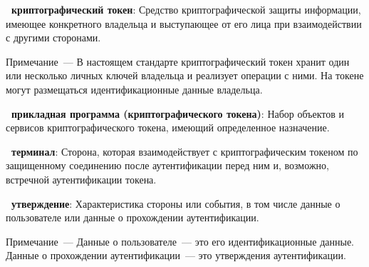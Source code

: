 {\bf\thedefctr~криптографический токен}: 
Средство криптографической защиты информации, имеющее конкретного 
владельца и выступающее от его лица при взаимодействии с другими 
сторонами. 
%
\begin{note}
Примечание~--- В настоящем стандарте криптографический токен хранит один 
или несколько личных ключей владельца и реализует операции с ними.  
%
На токене могут размещаться идентификационные данные владельца. 
\end{note}

{\bf \thedefctr~прикладная программа (криптографического токена)}:
Набор объектов и сервисов криптографического токена, имеющий определенное 
назначение.

{\bf\thedefctr~терминал}: 
Сторона, которая взаимодействует с криптографическим токеном по 
защищенному соединению после аутентификации перед ним и, возможно, 
встречной аутентификации токена.

{\bf \thedefctr~утверждение}:
Характеристика стороны или события, 
в том числе данные о пользователе 
или данные о прохождении аутентификации.

\begin{note}
Примечание~--- 
Данные о пользователе~--– это его идентификационные данные. 
Данные о прохождении аутентификации~--– это утверждения аутентификации.
\end{note}

